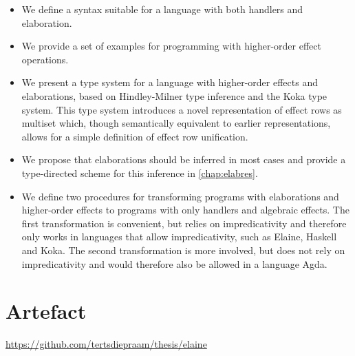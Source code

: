 \begin{itemize}
    \item We define a syntax suitable for a language with both handlers and elaboration.
    \item We provide a set of examples for programming with higher-order effect operations.
    \item We present a type system for a language with higher-order effects and elaborations, based on Hindley-Milner type inference and the Koka type system. This type system introduces a novel representation of effect rows as multiset which, though semantically equivalent to earlier representations, allows for a simple definition of effect row unification.
    \item We propose that elaborations should be inferred in most cases and provide a type-directed scheme for this inference in \cref{chap:elabres}.
    \item We define two procedures for transforming programs with elaborations and higher-order effects to programs with only handlers and algebraic effects. The first transformation is convenient, but relies on impredicativity and therefore only works in languages that allow impredicativity, such as Elaine, Haskell and Koka. The second transformation is more involved, but does not rely on impredicativity and would therefore also be allowed in a language Agda.
\end{itemize}

\section{Artefact}


\url{https://github.com/tertsdiepraam/thesis/elaine}